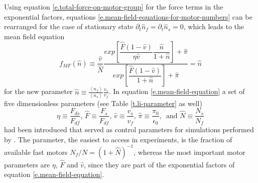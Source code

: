 Using equation \eqref{e.total-force-on-motor-group} for the force terms in the exponential factors, equations \eqref{e.mean-field-equations-for-motor-numbers} can be rearranged for the case of
stationary state \mbox{$\partial_t \hat n_f = \partial_t \hat n_s = 0$}, which leads to the mean field equation
\begin{equation}\label{e.mean-field-equation}
 f_{MF}\left(\hat n\right) \equiv \frac{\hat v}{\hat N}\frac{exp\left[\dfrac{\hat F \left(1 - \hat v\right)}{\eta \hat v}\dfrac{\hat n}{1 + \hat n}\right] + \hat \pi}{exp\left[\dfrac{\hat F \left(1 - \hat v\right)}{1 + \hat n}\right] + \hat \pi} = \hat n
\end{equation}
for the new parameter \mbox{$\hat n \equiv \frac{\left\langle n_f \right\rangle}{\left\langle n_s \right\rangle}\frac{v_s}{v_f}$}. In equation \eqref{e.mean-field-equation} a set of five
dimensionless parameters (see Table \ref{t.li-parameter} as well) 
\begin{equation}\label{e.dimensionless-paramaters}
 \eta \equiv \frac{F_{ds}}{F_{df}} \text{, } \hat F \equiv \frac{F_s}{F_{df}}\text{, } \hat v \equiv \frac{v_s}{v_f}\text{, } \hat \pi \equiv \frac{\pi_0}{\epsilon_0}\text{, } \text{ and } \hat N \equiv \frac{N_s}{N_f}
\end{equation}
had been introduced that served as control parameters for simulations performed by \cite{li}. The parameter, the easiest to access in experiments, is the fraction of available fast motors 
\mbox{$N_f / N = \left(1 + \hat N\right)^{-1}$}, whereas the most important motor parameters are $\eta$, $\hat F$ and $\hat v$, since they are part of the exponential factors of equation 
\eqref{e.mean-field-equation}.


